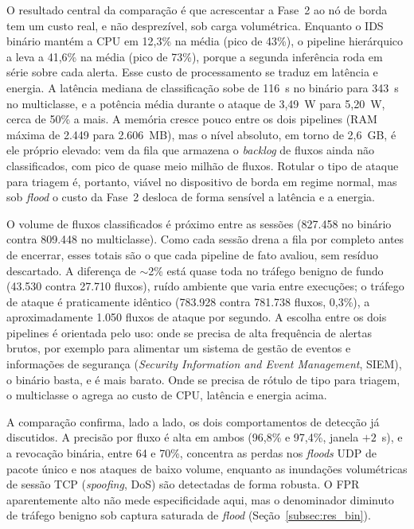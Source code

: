 \documentclass[12pt,a4paper]{article}
\begin{document}
O resultado central da comparação é que acrescentar a Fase~2 ao nó de borda tem
um custo real, e não desprezível, sob carga volumétrica. Enquanto o IDS binário
mantém a CPU em 12,3\% na média (pico de 43\%), o pipeline hierárquico a leva a
41,6\% na média (pico de 73\%), porque a segunda inferência roda em série sobre
cada alerta. Esse custo de processamento se traduz em latência e energia. A
latência mediana de classificação sobe de 116~s no binário para 343~s no
multiclasse, e a potência média durante o ataque de 3,49~W para 5,20~W, cerca de
50\% a mais. A memória cresce pouco entre os dois pipelines (RAM máxima de 2.449
para 2.606~MB), mas o nível absoluto, em torno de 2,6~GB, é ele próprio elevado:
vem da fila que armazena o \textit{backlog} de fluxos ainda não classificados,
com pico de quase meio milhão de fluxos. Rotular o tipo de ataque para triagem é,
portanto, viável no dispositivo de borda em regime normal, mas sob \textit{flood}
o custo da Fase~2 desloca de forma sensível a latência e a energia.

O volume de fluxos classificados é próximo entre as sessões (827.458 no binário
contra 809.448 no multiclasse). Como cada sessão drena a fila por completo antes
de encerrar, esses totais são o que cada pipeline de fato avaliou, sem resíduo
descartado. A diferença de $\sim$2\% está quase toda no tráfego benigno de fundo
(43.530 contra 27.710 fluxos), ruído ambiente que varia entre execuções; o
tráfego de ataque é praticamente idêntico (783.928 contra 781.738 fluxos, 0,3\%),
a aproximadamente 1.050 fluxos de ataque por segundo. A escolha entre os dois
pipelines é orientada pelo uso: onde se
precisa de alta frequência de alertas brutos, por exemplo para alimentar um
sistema de gestão de eventos e informações de segurança (\textit{Security
Information and Event Management}, SIEM), o binário basta, e é mais barato. Onde se
precisa de rótulo de tipo para triagem, o multiclasse o agrega ao custo de CPU,
latência e energia acima.

A comparação confirma, lado a lado, os dois comportamentos de detecção já
discutidos. A precisão por fluxo é alta em ambos (96,8\% e 97,4\%, janela $+2$~s),
e a revocação binária, entre 64 e 70\%, concentra as perdas nos \textit{floods}
UDP de pacote único e nos ataques de baixo volume, enquanto as inundações
volumétricas de sessão TCP (\textit{spoofing}, DoS) são detectadas de forma
robusta. O FPR aparentemente alto não mede especificidade aqui, mas o denominador
diminuto de tráfego benigno sob captura saturada de \textit{flood}
(Seção~\ref{subsec:res_bin}).
\end{document}
